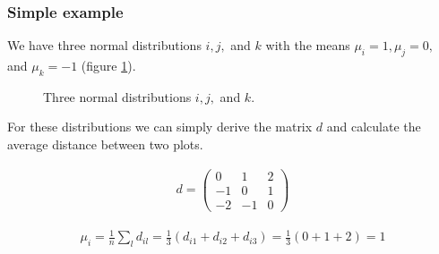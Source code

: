 \documentclass[../main/Notes.tex]{subfiles}
\begin{document}
\subsubsection*{Simple example}
We have three normal distributions $i, j,$ and $k$ with the means $\mu_i = 1, \mu_j = 0,$ and $\mu_k = -1$ (figure \ref{fig:2014-07-04-normaldists}).
\begin{figure}[htb]
  \centering
  \caption{Three normal distributions $i, j,$ and $k$.}
  \label{fig:2014-07-04-normaldists}
\end{figure}

For these distributions we can simply derive the matrix $d$ and calculate the average distance between two plots.

\begin{align*}
d = \left( \begin{array}{ccc}
 0 &  1 & 2 \\
-1 &  0 & 1 \\
-2 & -1 & 0
\end{array} \right)
\end{align*}

\begin{align*}
\mu_i = \frac{1}{n} \sum\limits_l d_{il} = \frac{1}{3} \left( d_{i1} + d_{i2} + d_{i3} \right) = \frac{1}{3} \left( 0 + 1 + 2 \right) = 1
\end{align*}
\end{document}
